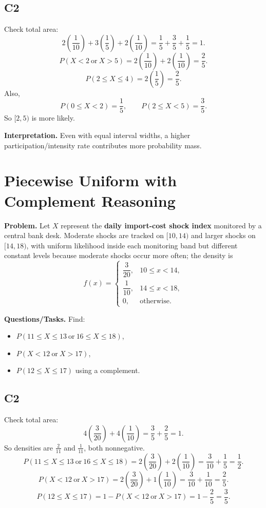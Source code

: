 \subsection*{C2}
Check total area:
\[
2\left(\frac{1}{10}\right)+3\left(\frac{1}{5}\right)+2\left(\frac{1}{10}\right)=\frac{1}{5}+\frac{3}{5}+\frac{1}{5}=1.
\]
\[
P(X<2\ \text{or}\ X>5)=2\left(\frac{1}{10}\right)+2\left(\frac{1}{10}\right)=\frac{2}{5}.
\]
\[
P(2\le X\le 4)=2\left(\frac{1}{5}\right)=\frac{2}{5}.
\]
Also,
\[
P(0\le X<2)=\frac{1}{5},\qquad P(2\le X<5)=\frac{3}{5}.
\]
So $[2,5)$ is more likely.

\textbf{Interpretation.}
Even with equal interval widths, a higher participation/intensity rate contributes more probability mass.

\section{Piecewise Uniform with Complement Reasoning}

\textbf{Problem.}
Let $X$ represent the \textbf{daily import-cost shock index} monitored by a central bank desk. Moderate shocks are tracked on $[10,14)$ and larger shocks on $[14,18)$, with uniform likelihood inside each monitoring band but different constant levels because moderate shocks occur more often; the density is
\[
f(x)=
\begin{cases}
\dfrac{3}{20}, & 10\le x<14,\\
\dfrac{1}{10}, & 14\le x<18,\\
0, & \text{otherwise.}
\end{cases}
\]

\textbf{Questions/Tasks.}
Find:
\begin{itemize}
    \item[(a)] $P(11\le X\le 13\ \text{or}\ 16\le X\le 18)$,
    \item[(b)] $P(X<12\ \text{or}\ X>17)$,
    \item[(c)] $P(12\le X\le 17)$ using a complement.
\end{itemize}

\subsection*{C2}
Check total area:
\[
4\left(\frac{3}{20}\right)+4\left(\frac{1}{10}\right)=\frac{3}{5}+\frac{2}{5}=1.
\]
So densities are $\frac{2}{11}$ and $\frac{1}{11}$, both nonnegative.
\[
P(11\le X\le 13\ \text{or}\ 16\le X\le 18)=2\left(\frac{3}{20}\right)+2\left(\frac{1}{10}\right)=\frac{3}{10}+\frac{1}{5}=\frac{1}{2}.
\]
\[
P(X<12\ \text{or}\ X>17)=2\left(\frac{3}{20}\right)+1\left(\frac{1}{10}\right)=\frac{3}{10}+\frac{1}{10}=\frac{2}{5}.
\]
\[
P(12\le X\le 17)=1-P(X<12\ \text{or}\ X>17)=1-\frac{2}{5}=\frac{3}{5}.
\]

